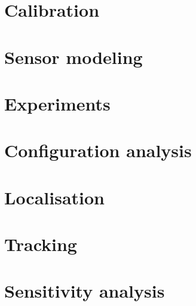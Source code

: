 \documentclass[10pt,a4paper]{report}
\begin{document}
\newpage
\section{Calibration}
\label{Calibration}

\newpage
\section{Sensor modeling}
\label{Sensor modeling}

\newpage
\section{Experiments}
\label{Experiments}

\newpage
\section{Configuration analysis}
\label{Configuration analysis}

\newpage
\section{Localisation}
\label{Localisationg}

\newpage
\section{Tracking}
\label{Tracking}

\newpage
\section{Sensitivity analysis}
\label{Sensitivity analysis}
\end{document}
